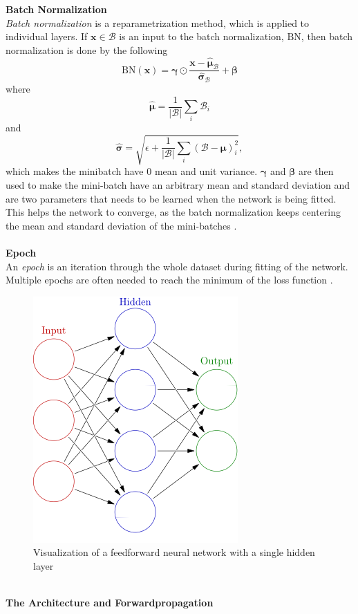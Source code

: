 \documentclass[./main.tex]{subfiles}
\begin{document}
\textbf{Batch Normalization} \\
\textit{Batch normalization} is a reparametrization method, which is applied to individual layers. If $\bm{x} \in \mathcal{B}$ is an input to the batch normalization, $\text{BN}$, then batch normalization is done by the following
$$\text{BN}(\bm{x}) = \bm{\gamma} \odot \frac{\bm{x} - \hat{\bm{\mu}}_{\mathcal{B}}}{\hat{\bm{\sigma}}_{\mathcal{B}}} + \bm{\beta}$$
where
$$\hat{\bm{\mu}} = \frac{1}{|\mathcal{B}|} \sum_{i} \mathcal{B}_i$$
and
$$\hat{\bm{\sigma}} = \sqrt{\epsilon + \frac{1}{|\mathcal{B}|} \sum_{i} \left(\mathcal{B} - \bm{\mu} \right)_i ^2 },$$
which makes the minibatch have $0$ mean and unit variance. $\bm{\gamma}$ and $\bm{\beta}$ are then used to make the mini-batch have an arbitrary mean and standard deviation and are two parameters that needs to be learned when the network is being fitted. This helps the network to converge, as the batch normalization keeps centering the mean and standard deviation of the mini-batches \cite{d2l}.
\\
\\
\textbf{Epoch} \\
An \textit{epoch} is an iteration through the whole dataset during fitting of the network. Multiple epochs are often needed to reach the minimum of the loss function \cite{d2l}.
\\
\begin{figure}[htbp]
    \centering
    \includegraphics[height = 5 cm]{entities/feed_forward_nn.jpg}
    \caption{Visualization of a feedforward neural network with a single hidden layer \cite{feedforward_nn}}
    \label{feedforward_nn}
\end{figure}
\\
\noindent \textbf{The Architecture and Forwardpropagation} \\
\end{document}
